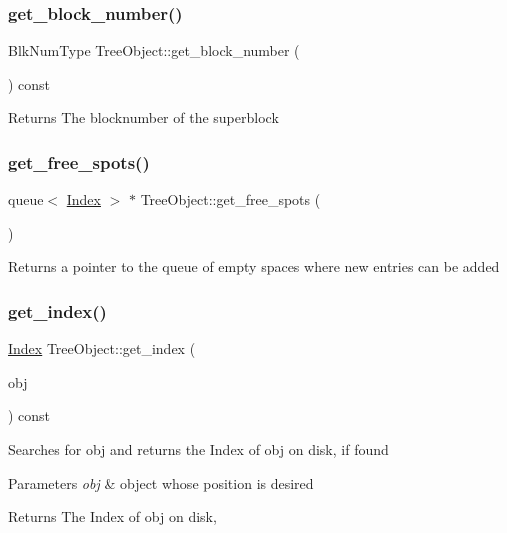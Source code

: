 \subsubsection{\texorpdfstring{get\+\_\+block\+\_\+number()}{get\_block\_number()}}
{\footnotesize\ttfamily Blk\+Num\+Type Tree\+Object\+::get\+\_\+block\+\_\+number (\begin{DoxyParamCaption}{ }\end{DoxyParamCaption}) const}

\begin{DoxyReturn}{Returns}
The blocknumber of the superblock 
\end{DoxyReturn}
\mbox{\label{classTreeObject_aa0900ad50c10023e4700f11218d30d7a}} 
\subsubsection{\texorpdfstring{get\+\_\+free\+\_\+spots()}{get\_free\_spots()}}
{\footnotesize\ttfamily queue$<$ \mbox{\hyperlink{structindex}{Index}} $>$ $\ast$ Tree\+Object\+::get\+\_\+free\+\_\+spots (\begin{DoxyParamCaption}{ }\end{DoxyParamCaption})}

\begin{DoxyReturn}{Returns}
a pointer to the queue of empty spaces where new entries can be added 
\end{DoxyReturn}
\mbox{\label{classTreeObject_ae0983a3ff99d413e22beaaac8d7b6d12}} 
\subsubsection{\texorpdfstring{get\+\_\+index()}{get\_index()}}
{\footnotesize\ttfamily \mbox{\hyperlink{structindex}{Index}} Tree\+Object\+::get\+\_\+index (\begin{DoxyParamCaption}\item[{\mbox{\hyperlink{classTreeObject}{Tree\+Object}} $\ast$}]{obj }\end{DoxyParamCaption}) const}

Searches for obj and returns the Index of obj on disk, if found 
\begin{DoxyParams}{Parameters}
{\em obj} & object whose position is desired \\
\hline
\end{DoxyParams}
\begin{DoxyReturn}{Returns}
The Index of obj on disk, 
\end{DoxyReturn}

